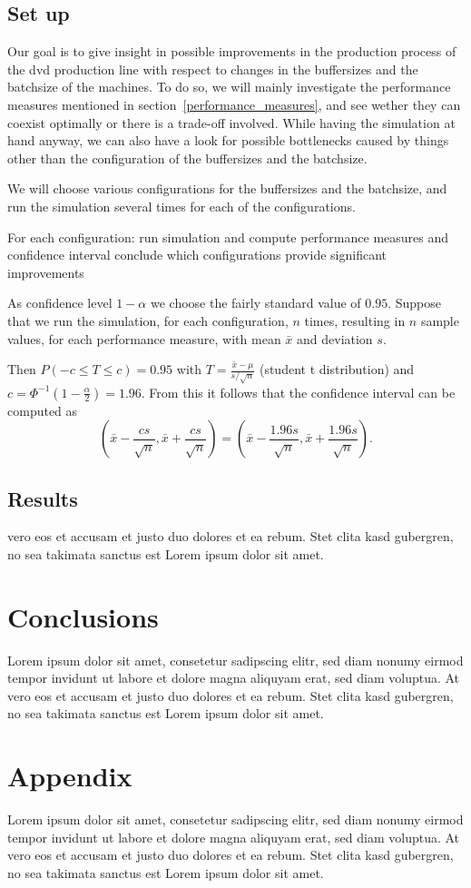 \documentclass{article}
\begin{document}
\subsection{Set up}
Our goal is to give insight in possible improvements in the production process of the dvd production line with respect to changes in the buffersizes and the batchsize of the machines.
To do so, we will mainly investigate the performance measures mentioned in section~\ref{performance_measures}, and see wether they can coexist optimally or there is a trade-off involved.
While having the simulation at hand anyway, we can also have a look for possible bottlenecks caused by things other than the configuration of the buffersizes and the batchsize.

We will choose various configurations for the buffersizes and the batchsize, and run the simulation several times for each of the configurations.

For each configuration:
    run simulation and compute performance measures and confidence interval
    conclude which configurations provide significant improvements


As confidence level $1 - \alpha$ we choose the fairly standard value of $0.95$.
Suppose that we run the simulation, for each configuration, $n$ times, resulting in $n$ sample values, for each performance measure, with mean $\bar{x}$ and deviation $s$.

Then $P(-c \leq T \leq c) = 0.95 $ with $T = \frac{\bar{x} - \mu}{s/\sqrt{n}}$ (student t distribution) and $c = \Phi ^{-1} (1 - \frac{\alpha}{2})= 1.96$.
From this it follows that the confidence interval can be computed as
\[ (\bar{x} - \frac{cs}{\sqrt{n}}, \bar{x} + \frac{cs}{\sqrt{n}}) =
(\bar{x} - \frac{1.96s}{\sqrt{n}}, \bar{x} + \frac{1.96s}{\sqrt{n}}). \]


\subsection{Results}
vero eos et accusam et justo duo dolores et ea rebum. Stet clita kasd gubergren,
no sea takimata sanctus est Lorem ipsum dolor sit amet.


\section{Conclusions}
Lorem ipsum dolor sit amet, consetetur sadipscing elitr, sed diam nonumy eirmod
tempor invidunt ut labore et dolore magna aliquyam erat, sed diam voluptua. At
vero eos et accusam et justo duo dolores et ea rebum. Stet clita kasd gubergren,
no sea takimata sanctus est Lorem ipsum dolor sit amet.


\section{Appendix}
Lorem ipsum dolor sit amet, consetetur sadipscing elitr, sed diam nonumy eirmod
tempor invidunt ut labore et dolore magna aliquyam erat, sed diam voluptua. At
vero eos et accusam et justo duo dolores et ea rebum. Stet clita kasd gubergren,
no sea takimata sanctus est Lorem ipsum dolor sit amet.
\end{document}
